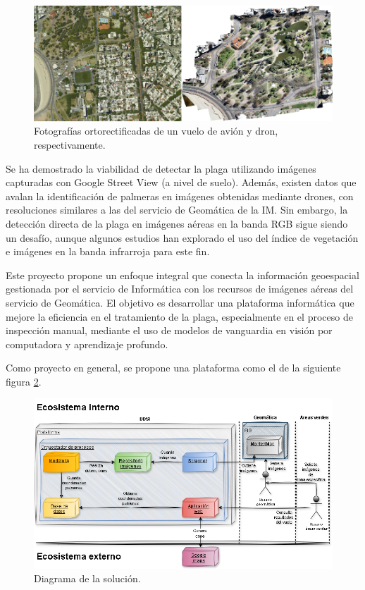 \documentclass[
11pt, %
]{charter}
\begin{document}
\begin{figure}[H]
  \centering
  \includegraphics[width=.95\textwidth]{./Figuras/imagen-dron-y-avion.png}
  \caption{Fotografías ortorectificadas de un vuelo de avión y dron, respectivamente.}
  \label{fig:imagen-dron-y-avion}
\end{figure}

Se ha demostrado la viabilidad de detectar la plaga utilizando imágenes capturadas con Google Street View (a nivel de suelo)\cite{kagan2024}. Además, existen datos que avalan la identificación de palmeras en imágenes obtenidas mediante drones, con resoluciones similares a las del servicio de Geomática de la IM. Sin embargo, la detección directa de la plaga en imágenes aéreas en la banda RGB sigue siendo un desafío, aunque algunos estudios han explorado el uso del índice de vegetación e imágenes en la banda infrarroja para este fin\cite{delalieux2023}.

Este proyecto propone un enfoque integral que conecta la información geoespacial gestionada por el servicio de Informática con los recursos de imágenes aéreas del servicio de Geomática. El objetivo es desarrollar una plataforma informática que mejore la eficiencia en el tratamiento de la plaga, especialmente en el proceso de inspección manual, mediante el uso de modelos de vanguardia en visión por computadora y aprendizaje profundo.

Como proyecto en general, se propone una plataforma como el de la siguiente figura \ref{fig:bosquejo-inicial-solucion}.

\begin{figure}[H]
  \centering
  \includegraphics[width=.95\textwidth]{./Figuras/bosquejo-inicial-solucion.png}
  \caption{Diagrama de la solución.}
  \label{fig:bosquejo-inicial-solucion}
\end{figure}
\end{document}
